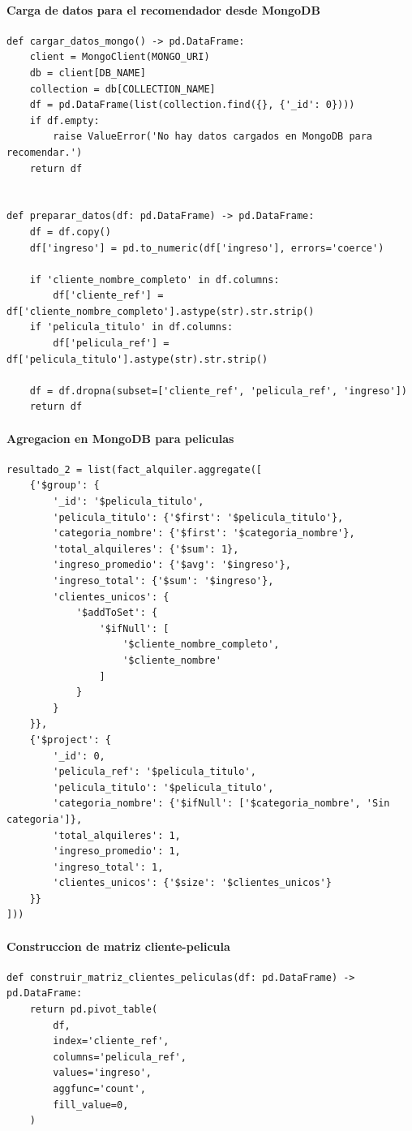 ﻿\documentclass{article}
\begin{document}
\paragraph{Carga de datos para el recomendador desde MongoDB}
\begin{lstlisting}
def cargar_datos_mongo() -> pd.DataFrame:
    client = MongoClient(MONGO_URI)
    db = client[DB_NAME]
    collection = db[COLLECTION_NAME]
    df = pd.DataFrame(list(collection.find({}, {'_id': 0})))
    if df.empty:
        raise ValueError('No hay datos cargados en MongoDB para recomendar.')
    return df


def preparar_datos(df: pd.DataFrame) -> pd.DataFrame:
    df = df.copy()
    df['ingreso'] = pd.to_numeric(df['ingreso'], errors='coerce')

    if 'cliente_nombre_completo' in df.columns:
        df['cliente_ref'] = df['cliente_nombre_completo'].astype(str).str.strip()
    if 'pelicula_titulo' in df.columns:
        df['pelicula_ref'] = df['pelicula_titulo'].astype(str).str.strip()

    df = df.dropna(subset=['cliente_ref', 'pelicula_ref', 'ingreso'])
    return df
\end{lstlisting}

\paragraph{Agregacion en MongoDB para peliculas}
\begin{lstlisting}
resultado_2 = list(fact_alquiler.aggregate([
    {'$group': {
        '_id': '$pelicula_titulo',
        'pelicula_titulo': {'$first': '$pelicula_titulo'},
        'categoria_nombre': {'$first': '$categoria_nombre'},
        'total_alquileres': {'$sum': 1},
        'ingreso_promedio': {'$avg': '$ingreso'},
        'ingreso_total': {'$sum': '$ingreso'},
        'clientes_unicos': {
            '$addToSet': {
                '$ifNull': [
                    '$cliente_nombre_completo',
                    '$cliente_nombre'
                ]
            }
        }
    }},
    {'$project': {
        '_id': 0,
        'pelicula_ref': '$pelicula_titulo',
        'pelicula_titulo': '$pelicula_titulo',
        'categoria_nombre': {'$ifNull': ['$categoria_nombre', 'Sin categoria']},
        'total_alquileres': 1,
        'ingreso_promedio': 1,
        'ingreso_total': 1,
        'clientes_unicos': {'$size': '$clientes_unicos'}
    }}
]))
\end{lstlisting}

\paragraph{Construccion de matriz cliente-pelicula}
\begin{lstlisting}
def construir_matriz_clientes_peliculas(df: pd.DataFrame) -> pd.DataFrame:
    return pd.pivot_table(
        df,
        index='cliente_ref',
        columns='pelicula_ref',
        values='ingreso',
        aggfunc='count',
        fill_value=0,
    )
\end{lstlisting}
\end{document}
